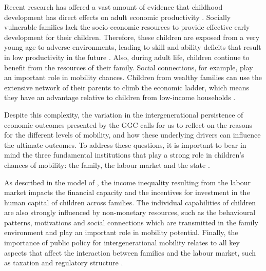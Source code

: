 \documentclass[a4paper, 12pt]{article}
\begin{document}
Recent research has offered a vast amount of evidence that childhood development has direct effects on adult economic productivity \citep{cunha2006interpreting, knudsen2006economic}. Socially vulnerable families lack the socio-economic resources to provide effective early development for their children. Therefore, these children are exposed from a very young age to adverse environments, leading to skill and ability deficits that result in low productivity in the future \citep{shonkoff2000handbook, lawrence2005lifetime}. Also, during adult life, children continue to benefit from the resources of their family. Social connections, for example, play an important role in mobility chances. Children from wealthy families can use the extensive network of their parents to climb the economic ladder, which means they have an advantage relative to children from low-income households \citep{corak2013income}.


Despite this complexity, the variation in the intergenerational persistence of economic outcomes presented by the GGC calls for us to reflect on the reasons for the different levels of mobility, and how these underlying drivers can influence the ultimate outcomes. To address these questions, it is important to bear in mind the three fundamental institutions that play a strong role in children’s chances of mobility: the family, the labour market and the state \citep{corak2013income, neidhofer2019intergenerational}.

As described in the model of \citet{Solon2004}, the income inequality resulting from the labour market impacts the financial capacity and the incentives for investment in the human capital of children across families. The individual capabilities of children are also strongly influenced by non-monetary resources, such as the behavioural patterns, motivations and social connections which are transmitted in the family environment and play an important role in mobility potential. Finally, the importance of public policy for intergenerational mobility relates to all key aspects that affect the interaction between families and the labour market, such as taxation and regulatory structure \citep{bjorklund2009intergenerational, corak2013income}.
\end{document}

